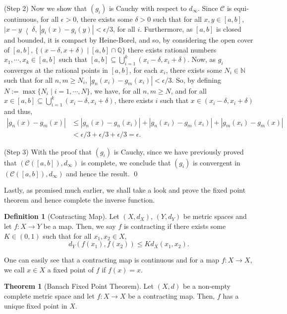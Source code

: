 \documentclass[
]{article}
\theoremstyle{definition}
\newtheorem{theorem}{Theorem}
\theoremstyle{definition}
\newtheorem{definition}{Definition}[section]
\begin{document}
(Step 2) Now we show that \((g_i)\) is Cauchy with respect to
\(d_\infty\). Since \(\mathcal{C}\) is equi-continuous, for all
\(\epsilon > 0\), there exists some \(\delta > 0\) such that for all
\(x, y \in [a, b]\), \(\left| x - y \right < \delta\),
\(\left| g_i(x) - g_i(y) \right| < \epsilon / 3\), for all \(i\).
Furthermore, as \([a, b]\) is closed and bounded, it is compact by
Heine-Borel, and so, by considering the open cover of \([a, b]\),
\(\{(x - \delta, x + \delta) \mid [a, b] \cap \mathbb{Q}\}\) there
exists rational numbers \(x_1, \cdots, x_k \in [a, b]\) such that
\([a, b] \subseteq \bigcup_{i = 1}^k (x_i - \delta, x_i + \delta)\).
Now, as \(g_i\) converges at the rational points in \([a, b]\), for each
\(x_i\), there exists some \(N_i \in \mathbb{N}\) such that for all
\(n, m \ge N_i\), \(\left| g_n(x_i) - g_m(x_i) \right| < \epsilon / 3\).
So, by defining \(N := \max \{N_i \mid i = 1, \cdots, N\}\), we have,
for all \(n, m \ge N\), and for all
\(x \in [a, b] \subseteq \bigcup_{i = 1}^k (x_i - \delta, x_i + \delta)\),
there exists \(i\) such that \(x \in (x_i - \delta, x_i + \delta)\) and
thus, \begin{align*}
    \left| g_n(x) - g_m(x) \right| & \le \left| g_n(x) - g_n(x_i) \right| 
    + \left| g_n(x_i) - g_m(x_i)\right| + \left| g_m(x_i) - g_m(x) \right| \\
      & < \epsilon / 3 + \epsilon / 3 + \epsilon / 3 = \epsilon.
  \end{align*}

(Step 3) With the proof that \((g_i)\) is Cauchy, since we have
previously proved that \((\mathcal{C}([a, b]), d_\infty)\) is complete,
we conclude that \((g_i)\) is convergent in
\((\mathcal{C}([a, b]), d_\infty)\) and hence the result. \qed

Lastly, as promised much earlier, we shall take a look and prove the
fixed point theorem and hence complete the inverse function.

\begin{definition}[Contracting Map]
  Let \((X, d_X)\), \((Y, d_Y)\) be metric spaces and let \(f : X \to Y\) be a map. 
  Then, we say \(f\) is contracting if there exists some \(K \in (0, 1)\) such that 
  for all \(x_1, x_2 \in X\), 
  \[d_Y(f(x_1), f(x_2)) \le Kd_X(x_1, x_2).\]
\end{definition}

One can easily see that a contracting map is continuous and for a map
\(f : X \to X\), we call \(x \in X\) a fixed point of \(f\) if
\(f(x) = x\).

\begin{theorem}[Banach Fixed Point Theorem]
  Let \((X, d)\) be a non-empty complete metric space and let \(f : X \to X\) be 
  a contracting map. Then, \(f\) has a unique fixed point in \(X\).
\end{theorem}
\proof
\end{document}
